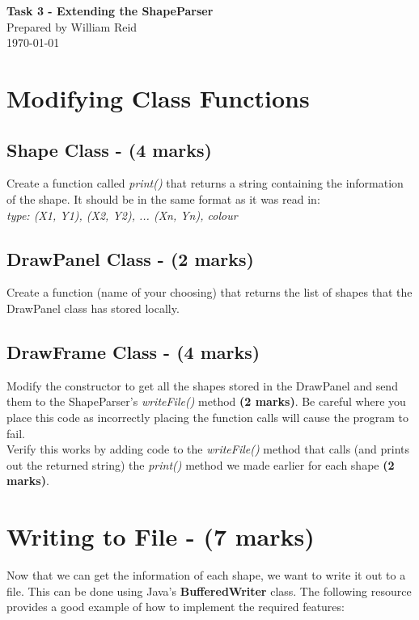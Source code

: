 \documentclass[a4paper,12pt]{article}
\begin{document}
\begin{center}
{\LARGE\bf Task 3 - Extending the ShapeParser}\\
\vspace{0.5cm}
Prepared by William Reid\\
\today
\end{center}

\vspace{0.5cm}
\section{Modifying Class Functions}
\subsection{Shape Class - (4 marks)}
Create a function called \textit{print()} that returns a string containing the information of the shape. It should be in the same format as it was read in:\\

\textit{type: (X1, Y1), (X2, Y2), ... (Xn, Yn), colour}

\subsection{DrawPanel Class - (2 marks)}
Create a function (name of your choosing) that returns the list of shapes that the DrawPanel class has stored locally.

\subsection{DrawFrame Class - (4 marks)}
Modify the constructor to get all the shapes stored in the DrawPanel and send them to the ShapeParser's \textit{writeFile()} method {\bf (2 marks)}. Be careful where you place this code as incorrectly placing the function calls will cause the program to fail.\\

Verify this works by adding code to the \textit{writeFile()} method that calls (and prints out the returned string) the \textit{print()} method we made earlier for each shape {\bf (2 marks)}.

\section{Writing to File - (7 marks)}
Now that we can get the information of each shape, we want to write it out to a file. This can be done using Java's {\bf BufferedWriter} class. The following resource provides a good example of how to implement the required features:\\
\end{document}
